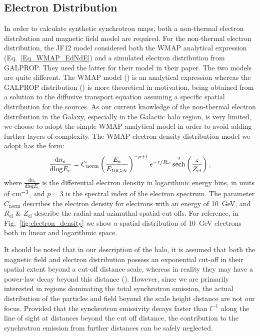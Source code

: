 \documentclass[usenatbib]{mnras}
\DeclareMathOperator{\sech}{sech}
\begin{document}
\subsection{Electron Distribution}

In order to calculate synthetic synchrotron maps, both a non-thermal electron distribution and magnetic field model are required. For the non-thermal electron distribution, the JF12 model considered both the WMAP analytical expression (Eq.~\ref{Eq_WMAP_EdNdE}) and a simulated electron distribution from GALPROP. They used the latter for their model in their paper. The two models are quite different. The WMAP model (\cite{WMAP_Page}) is an analytical expression whereas the GALPROP distribution (\cite{Hammurabi}) is more theoretical in motivation, being obtained from a solution to the diffusive transport equation assuming a specific spatial distribution for the sources. As our current knowledge of the non-thermal electron distribution in the Galaxy, especially in the Galactic halo region, is very limited, we choose to adopt the simple WMAP analytical model in order to avoid adding further layers of complexity. The WMAP electron density distribution model we adopt has the form:
\begin{equation}\label{Eq_WMAP_EdNdE}
    \frac{\mathrm{d}n_e}{\mathrm{dlog}E_{e}} =     C_\mathrm{norm} \left(\frac{E_e}{E_{\rm 10GeV}}\right)^{-p+1} e^{-r/R_{\mathrm{el}}} \sech^2\left(\frac{z}{Z_{\mathrm{el}}}\right), 
\end{equation}
where $\frac{\mathrm{d}n_e}{\mathrm{dlog}E_{e}}$ is the differential electron density in logarithmic energy bins, in units of ${\rm cm}^{-3}$, and $p =3$ is the spectral index of the electron spectrum. The parameter $C_\mathrm{norm}$ describes the electron density for electrons with an energy of 10~GeV, and $R_{\mathrm{el}}$ \& $Z_{\mathrm{el}}$ describe the radial and azimuthal spatial cut-offs. For reference, in Fig.~\ref{fig:electron_density} we show a spatial distribution of 10~GeV electrons both in linear and logarithmic space.

It should be noted that in our description of the halo, it is assumed that both the magnetic field and electron distribution possess an exponential cut-off in their spatial extent beyond a cut-off distance scale, whereas in reality they may have a power-law decay beyond this distance
(\cite{Hammurabi, Subramanian_2018, Bell_2022}). However, since we are primarily interested in regions dominating the total synchrotron emission, the actual distribution of the particles and field beyond the scale height distance are not our focus. Provided that the synchrotron emissivity decays faster than $l^{-1}$ along the line of sight at distances beyond the cut off distance, the contribution to the synchrotron emission from further distances can be safely neglected. 
\end{document}
